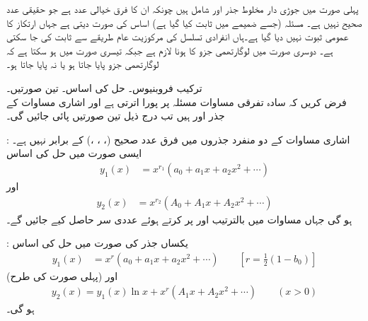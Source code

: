 پہلی صورت میں جوڑی دار مخلوط جذر  اور  شامل ہیں چونکہ ان کا فرق  خیالی عدد ہے جو حقیقی عدد صحیح نہیں ہے۔ مسئلہ  (جسے ضمیمے میں ثابت کیا گیا ہے) اساس کی صورت دیتی ہے جہاں ارتکاز کا عمومی ثبوت نہیں دیا گیا ہے۔ہاں انفرادی تسلسل کی مرکوزیت عام طریقے سے ثابت کی جا سکتی ہے۔  دوسری صورت میں لوگارتھمی جزو کا ہونا لازم ہے جبکہ تیسری صورت میں ہو سکتا ہے کہ لوگارتھمی جزو پایا جاتا ہو یا نہ پایا جاتا ہو۔

\quad ترکیب فروبنیوس۔ حل کی اساس۔ تین صورتیں۔\\
فرض کریں کہ سادہ تفرقی مساوات  مسئلہ  پر پورا اترتی ہے  اور اشاری مساوات  کے جذر  اور  ہیں تب درج ذیل تین صورتیں پائی جائیں گی۔


: اشاری مساوات کے دو  منفرد جذروں میں فرق عدد صحیح (، ، ،) کے برابر نہیں ہے۔ایسی صورت میں حل کی اساس
\begin{align}\label{مساوات_طاقتی_فروبنیوس_حل_الف}
y_1(x)&=x^{r_1}(a_0+a_1x+a_2x^2+\cdots)
\end{align}
اور
\begin{align}\label{مساوات_طاقتی_فروبنیوس_حل_ب}
y_2(x)&=x^{r_2}(A_0+A_1x+A_2x^2+\cdots)
\end{align}
ہو گی جہاں  مساوات  میں بالترتیب  اور  پر کرتے ہوئے عددی سر حاصل کیے جائیں گے۔

: یکساں جذر  کی صورت میں حل کی اساس
\begin{align}\label{مساوات_طاقتی_فروبنیوس_حل_پ}
y_1(x)&=x^{r}(a_0+a_1x+a_2x^2+\cdots) \quad \quad [r=\frac{1}{2}(1-b_0)]
\end{align}
(پہلی صورت کی طرح) اور
\begin{align}\label{مساوات_طاقتی_فروبنیوس_حل_ت}
y_2(x)=y_1(x)\ln x+x^{r}(A_1x+A_2x^2+\cdots) \quad \quad (x>0)
\end{align}
ہو گی۔

